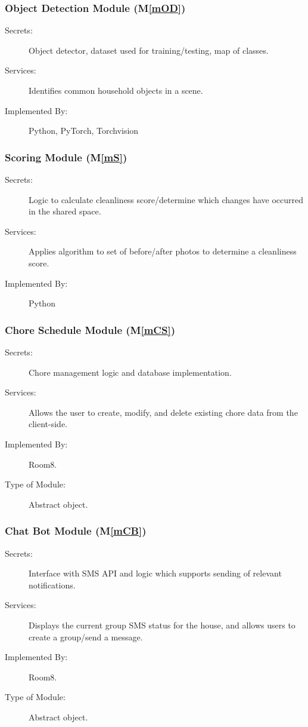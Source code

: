 \documentclass[12pt, titlepage]{article}
\newcommand{\mref}[1]{M\ref{#1}}
\begin{document}
\subsubsection{Object Detection Module (\mref{mOD})}

\begin{description}
\item[Secrets:]Object detector, dataset used for training/testing, map of classes. 
\item[Services:]Identifies common household objects in a scene.
\item[Implemented By:]Python, PyTorch, Torchvision
\end{description}

\subsubsection{Scoring Module (\mref{mS})}

\begin{description}
\item[Secrets:] Logic to calculate cleanliness score/determine which changes have occurred in the shared space.
\item[Services:] Applies algorithm to set of before/after photos to determine a cleanliness score.
\item[Implemented By:] Python
\end{description}

\subsubsection{Chore Schedule Module (\mref{mCS})}
\begin{description}
\item[Secrets:] Chore management logic and database implementation.
\item[Services:] Allows the user to create, modify, and delete existing chore data from the client-side.
\item[Implemented By:] Room8.
\item[Type of Module:] Abstract object.
\end{description}

\subsubsection{Chat Bot Module (\mref{mCB})}
\begin{description}
\item[Secrets:] Interface with SMS API and logic which supports sending of relevant notifications.
\item[Services:] Displays the current group SMS status for the house, and allows users to create a group/send a message.
\item[Implemented By:] Room8.
\item[Type of Module:] Abstract object.
\end{description}
\end{document}
